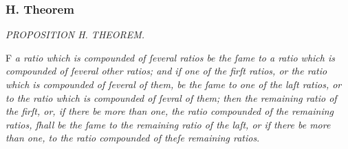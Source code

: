 \documentclass[12pt,preview]{standalone}
\begin{document}
\subsubsection{H. Theorem}

\newcommand{\redA}{{\color{cred}{A}}}
\newcommand{\redB}{{\color{cred}{B}}}
\newcommand{\redC}{{\color{cred}{C}}}
\newcommand{\redD}{{\color{cred}{D}}}
\newcommand{\redE}{{\color{cred}{E}}}
\newcommand{\redF}{{\color{cred}{F}}}
\newcommand{\redG}{{\color{cred}{G}}}
\newcommand{\redH}{{\color{cred}{H}}}

\newcommand{\blueP}{{\color{cblue}{P}}}
\newcommand{\blueQ}{{\color{cblue}{Q}}}
\newcommand{\blueR}{{\color{cblue}{R}}}
\newcommand{\blueS}{{\color{cblue}{S}}}
\newcommand{\blueT}{{\color{cblue}{T}}}
\newcommand{\blueX}{{\color{cblue}{X}}}

\begin{minipage}{\textwidth}

    \begin{center}
        \textit{PROPOSITION H. THEOREM.}\label{book5prH} \\
    \end{center}

    \hfill

    \begin{center}
        \raggedright \lettrine[lines=4, loversize=1, nindent=0pt]{}{}F \textit{a ratio which is compounded of ſeveral ratios be the ſame to a ratio which is compounded of ſeveral other ratios; and if one of the firſt ratios, or the ratio which is compounded of ſeveral of them, be the ſame to one of the laſt ratios, or to the ratio which is compounded of ſevral of them; then the remaining ratio of the firſt, or, if there be more than one, the ratio compounded of the remaining ratios, ſhall be the ſame to the remaining ratio of the laſt, or if there be more than one, to the ratio compounded of theſe remaining ratios}.
    \end{center}

    \hfill

    \hfill

    \begin{center}
        \minibox[frame,c]{\redA\ \ \redB\ \ \redC\ \ \redD\ \ \redE\ \ \redF\ \ \redG\ \ \redH \\ \blueP\ \ \blueQ\ \ \blueR\ \ \blueS\ \ \blueT\ \ \blueX}
    \end{center}

    \hfill

    \hfill


\end{minipage}
\end{document}
